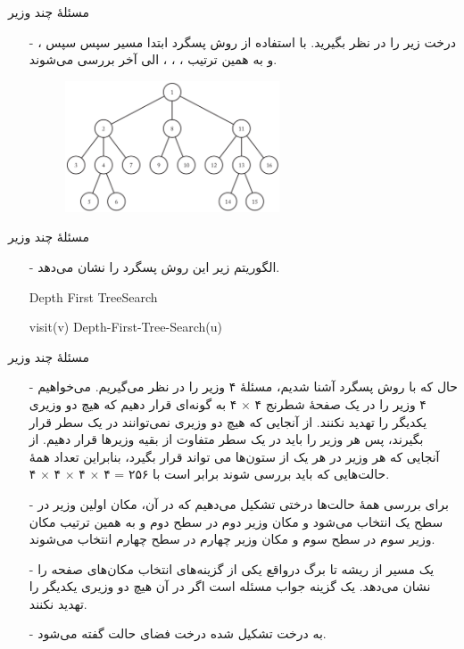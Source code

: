 \begin{frame}{مسئلهٔ چند وزیر}
\begin{itemize}\itemr
\item[-]
درخت زیر را در نظر بگیرید. با استفاده از روش پسگرد ابتدا مسیر
سپس
سپس
، و به همین ترتیب
،
،
، الی آخر بررسی می‌شوند.
\begin{figure}
\includegraphics[width=0.6\textwidth]{figs/chap06/tree-backtrack}
\end{figure}
\end{itemize}
\end{frame}


\begin{frame}{مسئلهٔ چند وزیر}
\begin{itemize}\itemr
\item[-]
الگوریتم زیر این روش پسگرد را نشان می‌دهد.
\begin{algorithm}[H]\alglr
  \caption{Depth First TreeSearch} 
  \begin{algorithmic}[1]
	 \State visit(v)
   			\State Depth-First-Tree-Search(u)
   	 \EndFor                     
  \end{algorithmic}
  \label{alg:merge}
\end{algorithm}
\end{itemize}
\end{frame}


\begin{frame}{مسئلهٔ چند وزیر}
\begin{itemize}\itemr
\item[-]
حال که با روش پسگرد آشنا شدیم، مسئلهٔ ۴ وزیر را در نظر می‌گیریم. می‌خواهیم ۴ وزیر را در یک صفحهٔ شطرنج
۴ $\times$ ۴
به گونه‌ای قرار دهیم که هیچ دو وزیری یکدیگر را تهدید نکنند. از آنجایی که هیچ دو وزیری نمی‌توانند در یک سطر قرار بگیرند، پس هر وزیر را باید در یک سطر متفاوت از بقیه وزیرها قرار دهیم. از آنجایی که هر وزیر در هر یک از ستون‌ها می تواند قرار بگیرد، بنابراین تعداد همهٔ حالت‌هایی که باید بررسی شوند برابر است با
۲۵۶ = ۴ $\times$ ۴ $\times$ ۴ $\times$ ۴.
\item[-]
برای بررسی همهٔ حالت‌ها درختی تشکیل می‌دهیم که در آن،
مکان اولین وزیر در سطح یک انتخاب می‌شود و مکان وزیر دوم در سطح دوم و به همین ترتیب مکان وزیر سوم در سطح سوم و مکان وزیر چهارم در سطح چهارم انتخاب می‌شوند.
\item[-]
یک مسیر از ریشه تا برگ درواقع یکی از گزینه‌های انتخاب مکان‌های صفحه را نشان می‌دهد. یک گزینه جواب مسئله است اگر در آن هیچ دو وزیری یکدیگر را تهدید نکنند.
\item[-]
به درخت تشکیل شده درخت فضای حالت گفته می‌شود.
\end{itemize}
\end{frame}


